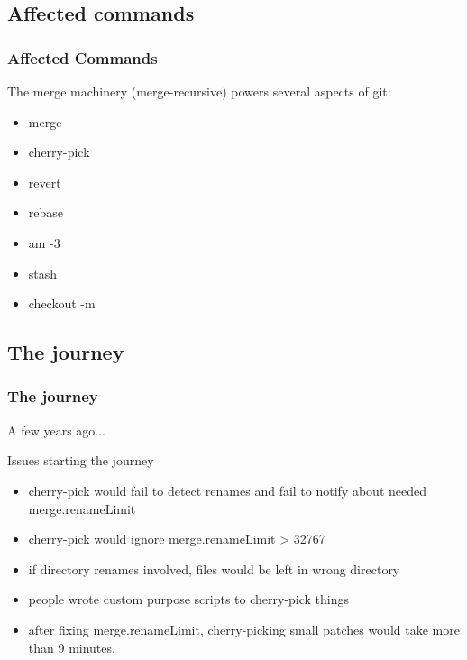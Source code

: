 \documentclass[compress,t]{beamer}
\begin{document}

\subsection{Affected commands}
\begin{frame}
  \frametitle{Affected Commands}

  The merge machinery (merge-recursive) powers several aspects of git:

  \begin{itemize}
    \item merge
    \item cherry-pick
    \item revert
    \item rebase
    \item am -3
    \item stash
    \item checkout -m
  \end{itemize}

\end{frame}


\subsection[Issues]{The journey}
\begin{frame}
  \frametitle{The journey}

  A few years ago...

  \begin{minipage}{0.88\textwidth}
  \begin{block}{Issues starting the journey}
    {\footnotesize
    \begin{itemize}
      \item cherry-pick would fail to detect renames and fail to notify
            about needed merge.renameLimit
      \item cherry-pick would ignore merge.renameLimit > 32767
      \item if directory renames involved, files would be left in wrong
            directory
      \item people wrote custom purpose scripts to cherry-pick things
      \item after fixing merge.renameLimit, cherry-picking small patches
            would take more than 9 minutes.
    \end{itemize}
    }
  \end{block}
  \end{minipage}

\end{frame}
\end{document}
